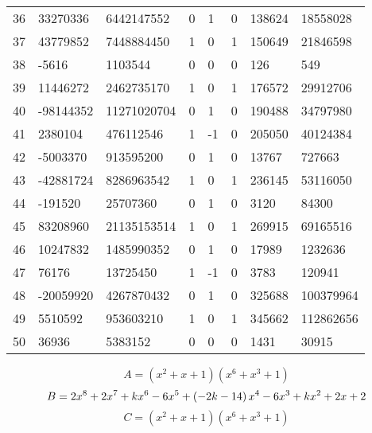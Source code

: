 \documentclass{amsart}
\begin{document}
\begin{longtable}{|l|l|l|lllll|}
36&33270336&6442147552&0&1&0&138624&18558028\\
37&43779852&7448884450&1&0&1&150649&21846598\\
38&-5616&1103544&0&0&0&126&549\\
39&11446272&2462735170&1&0&1&176572&29912706\\
40&-98144352&11271020704&0&1&0&190488&34797980\\
41&2380104&476112546&1&-1&0&205050&40124384\\
42&-5003370&913595200&0&1&0&13767&727663\\
43&-42881724&8286963542&1&0&1&236145&53116050\\
44&-191520&25707360&0&1&0&3120&84300\\
45&83208960&21135153514&1&0&1&269915&69165516\\
46&10247832&1485990352&0&1&0&17989&1232636\\
47&76176&13725450&1&-1&0&3783&120941\\
48&-20059920&4267870432&0&1&0&325688&100379964\\
49&5510592&953603210&1&0&1&345662&112862656\\
50&36936&5383152&0&0&0&1431&30915\\
\hline
\end{longtable}
$$A=(x^2
 + x
 + 1)(x^6
 + x^3
 + 1)$$
$$B=2\*x^8
 + 2\*x^7
 + k\*x^6
 - 6\*x^5
 + \left(-2\*k
 - 14\right) \*x^4
 - 6\*x^3
 + k\*x^2
 + 2\*x
 + 2$$
$$C=(x^2
 + x
 + 1)(x^6
 + x^3
 + 1)$$
\end{document}
